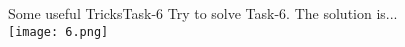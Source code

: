 \begin{frame}{Some useful Tricks}{Task-6}
    Try to solve Task-6. The solution is...\\ \pause
    \vspace{1em}
    \texttt{[image: 6.png]}
\end{frame}
